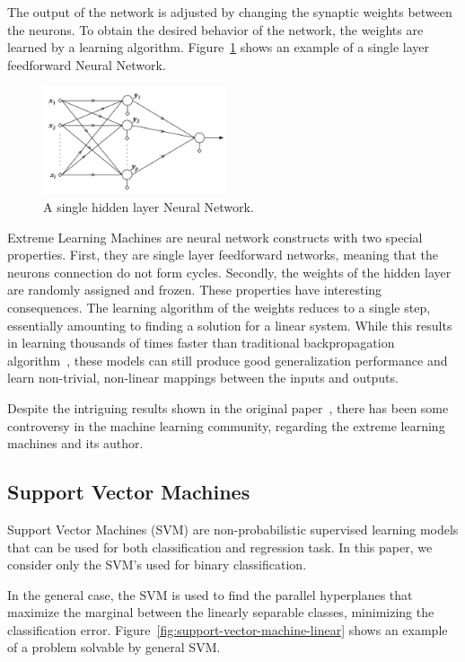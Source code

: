 The output of the network is adjusted by changing the synaptic weights between the neurons. To obtain the desired behavior of the network, the  weights are learned by a learning algorithm. Figure~\ref{fig:ELM} shows an example of a single layer feedforward Neural Network.~\cite{haykin:2009:neural-networks}

\begin{figure}[H]
\centering
\includegraphics[width=0.48\textwidth]{images/ELM.pdf}
\caption{A single hidden layer Neural Network.~\cite{theodoridis:2009:pattern-recognition}}
\label{fig:ELM}
\end{figure}

Extreme Learning Machines are neural network constructs with two special properties. First, they are single layer feedforward networks, meaning that the neurons connection do not form cycles. Secondly, the weights of the hidden layer are randomly assigned and frozen. These properties have interesting consequences. The learning algorithm of the weights reduces to a single step, essentially amounting to finding a solution for a linear system. While this results in learning thousands of times faster than traditional backpropagation algorithm~\cite{haykin:2009:neural-networks}, these models can still produce good generalization performance and learn non-trivial, non-linear mappings between the inputs and outputs.~\cite{huang:2006:elm}

Despite the intriguing results shown in the original paper~\cite{huang:2006:elm}, there has been some controversy in the machine learning community, regarding the extreme learning machines and its author.~\cite{reddit:2015:elm-controversy}

\subsection{Support Vector Machines}
Support Vector Machines (SVM) are non-probabilistic supervised learning models that can be used for both classification and regression task. In this paper, we consider only the SVM's used for binary classification.

In the general case, the SVM is used to find the parallel hyperplanes that maximize the marginal between the linearly separable classes, minimizing the classification error. Figure~\ref{fig:support-vector-machine-linear} shows an example of a problem solvable by general SVM.~\cite{theodoridis:2009:pattern-recognition}

